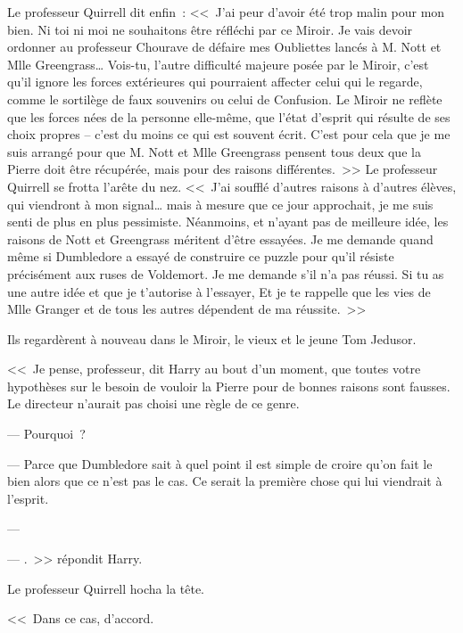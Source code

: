 Le professeur Quirrell dit enfin~: <<~J'ai peur d'avoir été trop malin pour mon bien. Ni toi ni moi ne souhaitons être réfléchi par ce Miroir. Je vais devoir ordonner au professeur Chourave de défaire mes Oubliettes lancés à M. Nott et Mlle Greengrass… Vois-tu, l'autre difficulté majeure posée par le Miroir, c'est qu'il ignore les forces extérieures qui pourraient affecter celui qui le regarde, comme le sortilège de faux souvenirs ou celui de Confusion. Le Miroir ne reflète que les forces nées de la personne elle-même, que l'état d'esprit qui résulte de ses choix propres -- c'est du moins ce qui est souvent écrit. C'est pour cela que je me suis arrangé pour que M. Nott et Mlle Greengrass pensent tous deux que la Pierre doit être récupérée, mais pour des raisons différentes.~>> Le professeur Quirrell se frotta l'arête du nez. <<~J'ai soufflé d'autres raisons à d'autres élèves, qui viendront à mon signal… mais à mesure que ce jour approchait, je me suis senti de plus en plus pessimiste. Néanmoins, et n'ayant pas de meilleure idée, les raisons de Nott et Greengrass méritent d'être essayées. Je me demande quand même si Dumbledore a essayé de construire ce puzzle pour qu'il résiste précisément aux ruses de Voldemort. Je me demande s'il n'a pas réussi. Si tu as une autre idée et que je t'autorise à l'essayer,  Et je te rappelle que les vies de Mlle Granger et de tous les autres dépendent de ma réussite.~>>

Ils regardèrent à nouveau dans le Miroir, le vieux et le jeune Tom Jedusor.

<<~Je pense, professeur, dit Harry au bout d'un moment, que toutes votre hypothèses sur le besoin de vouloir la Pierre pour de bonnes raisons sont fausses. Le directeur n'aurait pas choisi une règle de ce genre.

--- Pourquoi~?

--- Parce que Dumbledore sait à quel point il est simple de croire qu'on fait le bien alors que ce n'est pas le cas. Ce serait la première chose qui lui viendrait à l'esprit.

--- 

--- .~>> répondit Harry.

Le professeur Quirrell hocha la tête.

<<~Dans ce cas, d'accord.

